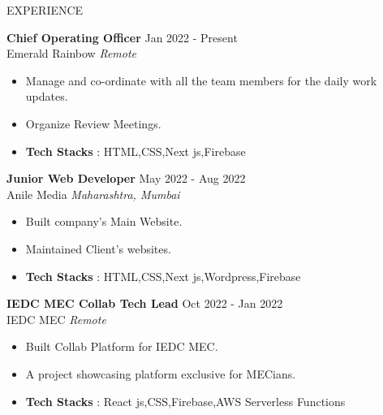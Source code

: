 \documentclass{resume} %
\begin{document}
	\begin{rSection}{EXPERIENCE}
		
			\textbf{Chief Operating Officer} \hfill Jan 2022 - Present\\
			Emerald Rainbow \hfill \textit{Remote}
		\begin{itemize}
			\itemsep -3pt {} 
			\item Manage and co-ordinate with all the team members for the daily work updates.
			\item Organize Review Meetings.
			\item \textbf{Tech Stacks} : HTML,CSS,Next js,Firebase 
		\end{itemize}
		
		\textbf{Junior Web Developer} \hfill May 2022 - Aug 2022\\
		Anile Media \hfill \textit{Maharashtra, Mumbai}
		\begin{itemize}
			\itemsep -3pt {} 
			\item Built company's Main Website.
			\item Maintained Client's websites.
			\item \textbf{Tech Stacks} : HTML,CSS,Next js,Wordpress,Firebase 
		\end{itemize}
	
		
		\textbf{IEDC MEC Collab Tech Lead} \hfill Oct 2022 - Jan 2022\\
	IEDC MEC \hfill \textit{Remote}
	\begin{itemize}
		\itemsep -3pt {} 
		\item Built Collab Platform for IEDC MEC.
		\item A project showcasing platform exclusive for MECians.
		\item \textbf{Tech Stacks} : React js,CSS,Firebase,AWS Serverless Functions 
	\end{itemize}
		
	\end{rSection} 
	
	
\end{document}
